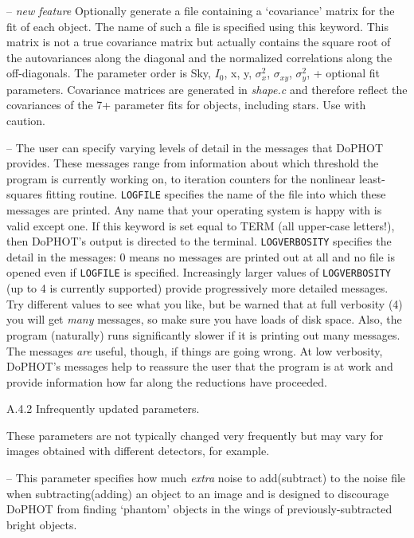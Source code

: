 -- {\it new feature} Optionally generate
a file containing a `covariance' matrix for the fit of each object.  The name of such 
a file is specified using this keyword.  This matrix is not a true covariance matrix
but actually contains the square root of the autovariances along the diagonal
and the normalized correlations along the off-diagonals.  The parameter order
is Sky, $I_0$, x, y, $\sigma_x^2$, $\sigma_{xy}$, $\sigma_y^2$, + optional fit 
parameters.  Covariance matrices are generated in {\it shape.c} and therefore
reflect the covariances of the 7+ parameter fits for objects, including stars.
Use with caution.

 -- The user can specify
varying levels of detail in the messages that 
DoPHOT provides.  These messages range from information about
which threshold the program is currently working on, to 
iteration counters for the nonlinear least-squares fitting routine.
{\tt LOGFILE} specifies the name of the file into which these
messages are printed.  Any name that your operating system is
happy with is valid except one.  If this keyword is set 
equal to  TERM (all upper-case letters!), then DoPHOT's output
is directed to the terminal.  {\tt LOGVERBOSITY} specifies the
detail in the messages:  0 means no messages are printed out at
all and no file is opened even if {\tt LOGFILE} is specified.
Increasingly larger values of {\tt LOGVERBOSITY} (up to 4 is 
currently supported) provide progressively
more detailed messages.  Try different values to see what you 
like, but be warned that at full verbosity (4) 
you will get {\it many} messages, so
make sure you have loads of disk space.  Also, the program
(naturally) runs significantly slower if it is printing out
many messages.  The messages {\it are} useful, though, if 
things are going wrong. At low verbosity, DoPHOT's messages
help to reassure the user that the program is at work and provide
information how far along the reductions have proceeded.

\centerline{A.4.2  Infrequently updated parameters.}

These parameters are not typically changed very frequently
but may vary for images obtained with different 
detectors, for example.

 -- This parameter specifies how
much {\it extra} noise to add(subtract) to the noise file when
subtracting(adding) an object to an image and is 
designed to discourage DoPHOT from finding `phantom' objects
in the wings of previously-subtracted bright objects.

